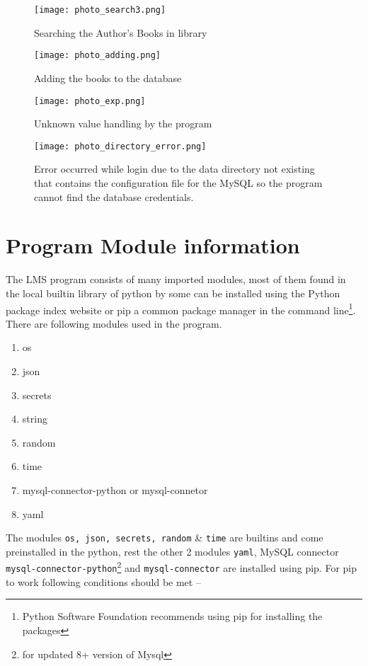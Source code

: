 \documentclass[12pt, a4paper, titlepage, openany]{report}
\begin{document}
\begin{figure}
\centering
\texttt{[image: photo\_search3.png]}
\caption{Searching the Author's Books in library}
\end{figure}

\begin{figure}
\centering
\texttt{[image: photo\_adding.png]}
\caption{Adding the books to the database}
\end{figure}

\begin{figure}
\centering
\texttt{[image: photo\_exp.png]}
\caption{Unknown value handling by the program}
\end{figure}

\begin{figure}
\centering
\texttt{[image: photo\_directory\_error.png]}
\caption{Error occurred while login due to the data directory not existing that contains the configuration file for the MySQL so the program cannot find the database credentials.}
\end{figure}
\newpage

\section{Program Module information}
The LMS program consists of many imported modules, most of them found in the local builtin library of python by some can be installed using the Python package index website or pip a common package manager in the command line\footnote{Python Software Foundation recommends using pip for installing the packages}. There are following modules used in the program.

\begin{enumerate}
\item os
\item json
\item secrets
\item string
\item random
\item time
\item mysql-connector-python or mysql-connetor
\item yaml
\end{enumerate}  

\begin{sloppypar}
The modules \verb+os, json, secrets, random+ \& \verb+time+ are builtins and come preinstalled in the python, rest the other 2 modules \verb+yaml+, MySQL connector \verb+mysql-connector-python+\footnote{for updated 8+ version of Mysql} and \verb+mysql-connector+ are installed using pip. For pip to work following conditions should be met --
\end{sloppypar}
\end{document}
